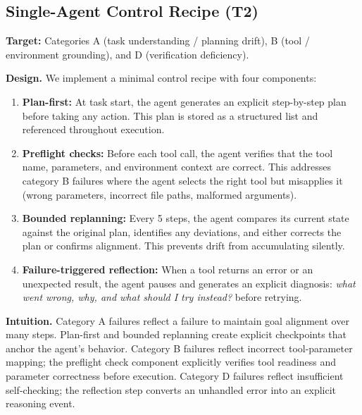 \subsection{Single-Agent Control Recipe (T2)}
\label{sec:recipes:control}


\textbf{Target:} Categories A (task understanding / planning drift), B (tool / environment grounding), and D (verification deficiency).

\textbf{Design.} We implement a minimal control recipe with four components:

\begin{enumerate}[leftmargin=2em, label=(\alph*), itemsep=0pt, parsep=0pt]
  \item \textbf{Plan-first:} At task start, the agent generates an explicit step-by-step plan before taking any action. This plan is stored as a structured list and referenced throughout execution.
  \item \textbf{Preflight checks:} Before each tool call, the agent verifies that the tool name, parameters, and environment context are correct. This addresses category B failures where the agent selects the right tool but misapplies it (wrong parameters, incorrect file paths, malformed arguments).
  \item \textbf{Bounded replanning:} Every 5 steps, the agent compares its current state against the original plan, identifies any deviations, and either corrects the plan or confirms alignment. This prevents drift from accumulating silently.
  \item \textbf{Failure-triggered reflection:} When a tool returns an error or an unexpected result, the agent pauses and generates an explicit diagnosis: \emph{what went wrong, why, and what should I try instead?} before retrying.
\end{enumerate}

\textbf{Intuition.} Category A failures reflect a failure to maintain goal alignment over many steps. Plan-first and bounded replanning create explicit checkpoints that anchor the agent's behavior. Category B failures reflect incorrect tool-parameter mapping; the preflight check component explicitly verifies tool readiness and parameter correctness before execution. Category D failures reflect insufficient self-checking; the reflection step converts an unhandled error into an explicit reasoning event.


